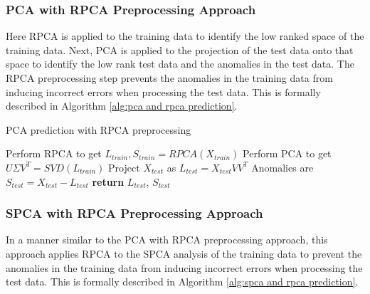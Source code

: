 \documentclass[conference]{IEEEtran}
\begin{document}
\subsubsection{PCA with RPCA Preprocessing Approach}
Here RPCA is applied to the training data to identify the low ranked space of the training data.  Next, PCA is applied to the projection of the test data onto that space to identify the low rank test data and the anomalies in the test data.  The RPCA preprocessing step prevents the anomalies in the training data from inducing incorrect errors when processing the test data.  This is formally described in Algorithm \ref{alg:pca and rpca prediction}.

\begin{algorithm}
\caption{PCA prediction with RPCA preprocessing}\label{alg:pca and rpca prediction}
\begin{algorithmic}[1]
\State Perform RPCA to get $L_{train}, S_{train} = RPCA(X_{train})$
\State Perform PCA to get $U \Sigma V^T = SVD(L_{train})$
\State Project $X_{test}$ as $L_{test} = X_{test} V V^T$
\State Anomalies are $S_{test} = X_{test} - L_{test}$
\State \textbf{return} $L_{test}$, $S_{test}$
\EndProcedure
\end{algorithmic}
\end{algorithm}
\subsubsection{SPCA with RPCA Preprocessing Approach}
In a manner similar to the  PCA with RPCA preprocessing approach, this approach applies RPCA to the SPCA analysis of the training data to prevent the anomalies in the training data from inducing incorrect errors when processing the test data.  This is formally described in Algorithm \ref {alg:spca and rpca prediction}.
\end{document}
